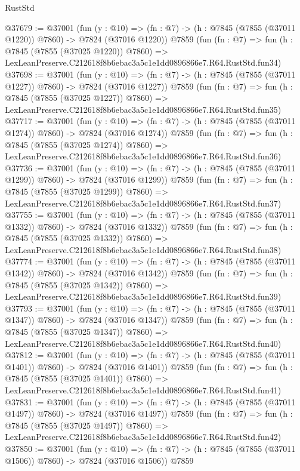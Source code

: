 \begin{lexlean}{RustStd}
\begin{coremodule}
@37679 := @37001
    (fun (y : @10) => (fn : @7) -> (h : @7845 (@7855 (@37011 @1220)) @7860) -> @7824 (@37016 @1220))
    @7859
    (fun (fn : @7) =>
    fun (h : @7845 (@7855 (@37025 @1220)) @7860) =>
    LexLeanPreserve.C212618f8b6ebac3a5c1e1dd0896866e7.R64.RustStd.fun34)
@37698 := @37001
    (fun (y : @10) => (fn : @7) -> (h : @7845 (@7855 (@37011 @1227)) @7860) -> @7824 (@37016 @1227))
    @7859
    (fun (fn : @7) =>
    fun (h : @7845 (@7855 (@37025 @1227)) @7860) =>
    LexLeanPreserve.C212618f8b6ebac3a5c1e1dd0896866e7.R64.RustStd.fun35)
@37717 := @37001
    (fun (y : @10) => (fn : @7) -> (h : @7845 (@7855 (@37011 @1274)) @7860) -> @7824 (@37016 @1274))
    @7859
    (fun (fn : @7) =>
    fun (h : @7845 (@7855 (@37025 @1274)) @7860) =>
    LexLeanPreserve.C212618f8b6ebac3a5c1e1dd0896866e7.R64.RustStd.fun36)
@37736 := @37001
    (fun (y : @10) => (fn : @7) -> (h : @7845 (@7855 (@37011 @1299)) @7860) -> @7824 (@37016 @1299))
    @7859
    (fun (fn : @7) =>
    fun (h : @7845 (@7855 (@37025 @1299)) @7860) =>
    LexLeanPreserve.C212618f8b6ebac3a5c1e1dd0896866e7.R64.RustStd.fun37)
@37755 := @37001
    (fun (y : @10) => (fn : @7) -> (h : @7845 (@7855 (@37011 @1332)) @7860) -> @7824 (@37016 @1332))
    @7859
    (fun (fn : @7) =>
    fun (h : @7845 (@7855 (@37025 @1332)) @7860) =>
    LexLeanPreserve.C212618f8b6ebac3a5c1e1dd0896866e7.R64.RustStd.fun38)
@37774 := @37001
    (fun (y : @10) => (fn : @7) -> (h : @7845 (@7855 (@37011 @1342)) @7860) -> @7824 (@37016 @1342))
    @7859
    (fun (fn : @7) =>
    fun (h : @7845 (@7855 (@37025 @1342)) @7860) =>
    LexLeanPreserve.C212618f8b6ebac3a5c1e1dd0896866e7.R64.RustStd.fun39)
@37793 := @37001
    (fun (y : @10) => (fn : @7) -> (h : @7845 (@7855 (@37011 @1347)) @7860) -> @7824 (@37016 @1347))
    @7859
    (fun (fn : @7) =>
    fun (h : @7845 (@7855 (@37025 @1347)) @7860) =>
    LexLeanPreserve.C212618f8b6ebac3a5c1e1dd0896866e7.R64.RustStd.fun40)
@37812 := @37001
    (fun (y : @10) => (fn : @7) -> (h : @7845 (@7855 (@37011 @1401)) @7860) -> @7824 (@37016 @1401))
    @7859
    (fun (fn : @7) =>
    fun (h : @7845 (@7855 (@37025 @1401)) @7860) =>
    LexLeanPreserve.C212618f8b6ebac3a5c1e1dd0896866e7.R64.RustStd.fun41)
@37831 := @37001
    (fun (y : @10) => (fn : @7) -> (h : @7845 (@7855 (@37011 @1497)) @7860) -> @7824 (@37016 @1497))
    @7859
    (fun (fn : @7) =>
    fun (h : @7845 (@7855 (@37025 @1497)) @7860) =>
    LexLeanPreserve.C212618f8b6ebac3a5c1e1dd0896866e7.R64.RustStd.fun42)
@37850 := @37001
    (fun (y : @10) => (fn : @7) -> (h : @7845 (@7855 (@37011 @1506)) @7860) -> @7824 (@37016 @1506))
    @7859

\end{coremodule}
\end{lexlean}
